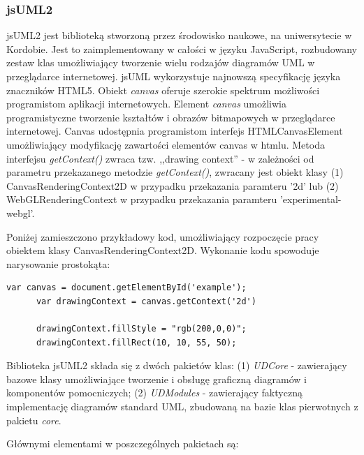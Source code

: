       \subsubsection{jsUML2}
        jsUML2 jest biblioteką stworzoną przez środowisko naukowe, na uniwersytecie w Kordobie. Jest to zaimplementowany w całości w języku JavaScript, rozbudowany zestaw klas umożliwiający tworzenie wielu rodzajów diagramów UML w przeglądarce internetowej. jsUML wykorzystuje najnowszą specyfikację języka znaczników HTML5. Obiekt \emph{canvas} oferuje szerokie spektrum możliwości programistom aplikacji internetowych. Element \emph{canvas} umożliwia programistyczne tworzenie kształtów i obrazów bitmapowych w przeglądarce internetowej. Canvas udostępnia programistom interfejs HTMLCanvasElement umożliwiający modyfikację zawartości elementów canvas w htmlu. Metoda interfejsu \emph{getContext()} zwraca tzw. ,,drawing context'' - w zależności od parametru przekazanego metodzie \emph{getContext()}, zwracany jest obiekt klasy (1) CanvasRenderingContext2D w przypadku przekazania paramteru '2d' lub (2) WebGLRenderingContext w przypadku przekazania paramteru 'experimental-webgl'.

        Poniżej zamieszczono przykładowy kod, umożliwiający rozpoczęcie pracy obiektem klasy CanvasRenderingContext2D. Wykonanie kodu spowoduje narysowanie prostokąta:

      \begin{lstlisting}[caption={przykład HTML5 canvas}, label={lst:canvas1}]
      var canvas = document.getElementById('example');
      var drawingContext = canvas.getContext('2d')

      drawingContext.fillStyle = "rgb(200,0,0)";  
      drawingContext.fillRect(10, 10, 55, 50);
      \end{lstlisting}

        Biblioteka jsUML2 składa się z dwóch pakietów klas: (1) \emph{UDCore} - zawierający bazowe klasy umożliwiające tworzenie i obsługę graficzną diagramów i komponentów pomocniczych; (2) \emph{UDModules} - zawierający faktyczną implementację diagramów standard UML, zbudowaną na bazie klas pierwotnych z pakietu \emph{core}.

        Głównymi elementami w poszczególnych pakietach są:

